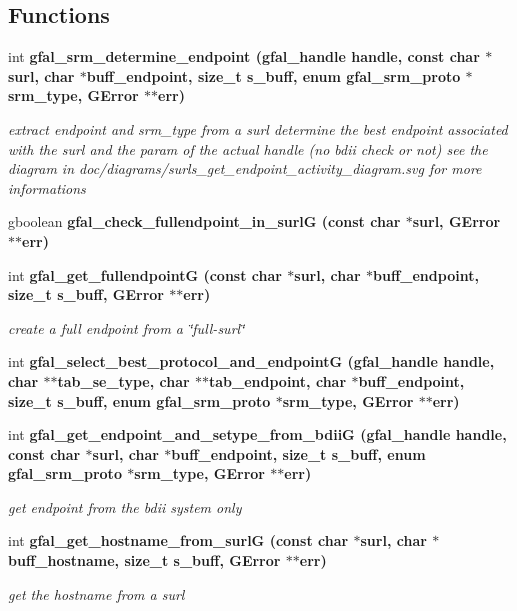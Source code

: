 \subsection*{Functions}
\begin{CompactItemize}
\item 
int \bf{gfal\_\-srm\_\-determine\_\-endpoint} (gfal\_\-handle handle, const char $\ast$surl, char $\ast$buff\_\-endpoint, size\_\-t s\_\-buff, enum gfal\_\-srm\_\-proto $\ast$srm\_\-type, GError $\ast$$\ast$err)
\begin{CompactList}\small\item\em extract endpoint and srm\_\-type from a surl determine the best endpoint associated with the surl and the param of the actual handle (no bdii check or not) see the diagram in doc/diagrams/surls\_\-get\_\-endpoint\_\-activity\_\-diagram.svg for more informations \item\end{CompactList}\item 
gboolean \bf{gfal\_\-check\_\-fullendpoint\_\-in\_\-surl\-G} (const char $\ast$surl, GError $\ast$$\ast$err)
\item 
int \bf{gfal\_\-get\_\-fullendpoint\-G} (const char $\ast$surl, char $\ast$buff\_\-endpoint, size\_\-t s\_\-buff, GError $\ast$$\ast$err)\label{gfal__common__srm__endpoint_8h_fbb46a068ea2a908160cb7b998377ffd}

\begin{CompactList}\small\item\em create a full endpoint from a \char`\"{}full-surl\char`\"{} \item\end{CompactList}\item 
int \bf{gfal\_\-select\_\-best\_\-protocol\_\-and\_\-endpoint\-G} (gfal\_\-handle handle, char $\ast$$\ast$tab\_\-se\_\-type, char $\ast$$\ast$tab\_\-endpoint, char $\ast$buff\_\-endpoint, size\_\-t s\_\-buff, enum gfal\_\-srm\_\-proto $\ast$srm\_\-type, GError $\ast$$\ast$err)
\item 
int \bf{gfal\_\-get\_\-endpoint\_\-and\_\-setype\_\-from\_\-bdii\-G} (gfal\_\-handle handle, const char $\ast$surl, char $\ast$buff\_\-endpoint, size\_\-t s\_\-buff, enum gfal\_\-srm\_\-proto $\ast$srm\_\-type, GError $\ast$$\ast$err)
\begin{CompactList}\small\item\em get endpoint from the bdii system only \item\end{CompactList}\item 
int \bf{gfal\_\-get\_\-hostname\_\-from\_\-surl\-G} (const char $\ast$surl, char $\ast$buff\_\-hostname, size\_\-t s\_\-buff, GError $\ast$$\ast$err)
\begin{CompactList}\small\item\em get the hostname from a surl \item\end{CompactList}\end{CompactItemize}


